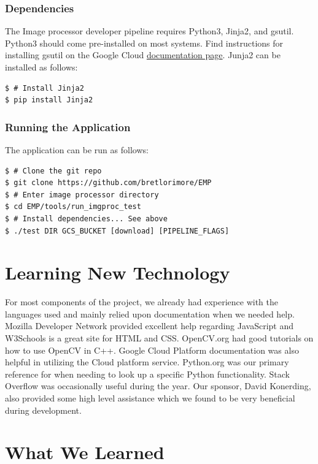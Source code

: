 \documentclass[10pt, onecolumn, draftclsnofoot, letterpaper, compsoc]{IEEEtran}
\begin{document}
\subsubsection{Dependencies}

The Image processor developer pipeline requires Python3, Jinja2, and gsutil. Python3 should come pre-installed on most systems.
Find instructions for installing gsutil on the Google Cloud \href{https://cloud.google.com/storage/docs/gsutil_install}{documentation page}.
Junja2 can be installed as follows:

\begin{verbatim}
$ # Install Jinja2
$ pip install Jinja2
\end{verbatim}

\subsubsection{Running the Application}

The application can be run as follows:

\begin{verbatim}
$ # Clone the git repo
$ git clone https://github.com/bretlorimore/EMP
$ # Enter image processor directory
$ cd EMP/tools/run_imgproc_test
$ # Install dependencies... See above
$ ./test DIR GCS_BUCKET [download] [PIPELINE_FLAGS]
\end{verbatim}

\section{Learning New Technology}
For most components of the project, we already had experience with the
languages used and mainly relied upon documentation when we needed help.
Mozilla Developer Network provided excellent help regarding JavaScript and
W3Schools is a great site for HTML and CSS.
OpenCV.org had good tutorials on how to use OpenCV in C++. Google Cloud
Platform documentation was also helpful in utilizing the Cloud platform
service. Python.org was our primary reference for when needing to look up
a specific Python functionality.
Stack Overflow was occasionally useful during the year.
Our sponsor, David Konerding, also provided some high level assistance which
we found to be very beneficial during development.


\section{What We Learned}
\end{document}
